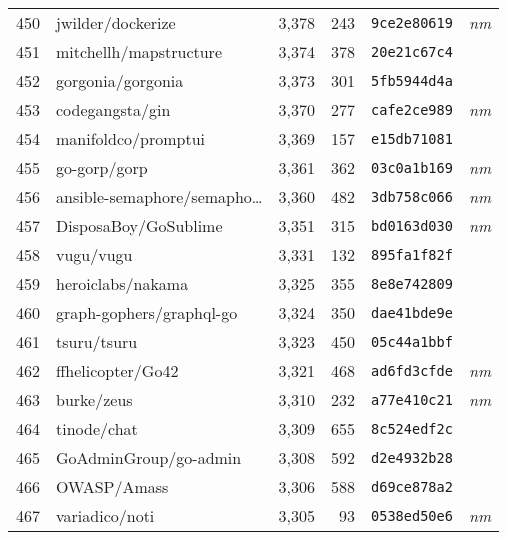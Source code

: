 {\begin{supertabular}{llrrll}
        450 &                  jwilder/dockerize &  3,378 &    243 &  \texttt{9ce2e80619} &  \textit{nm} \\
        451 &             mitchellh/mapstructure &  3,374 &    378 &  \texttt{20e21c67c4} &              \\
        452 &                  gorgonia/gorgonia &  3,373 &    301 &  \texttt{5fb5944d4a} &              \\
        453 &                    codegangsta/gin &  3,370 &    277 &  \texttt{cafe2ce989} &  \textit{nm} \\
        454 &                manifoldco/promptui &  3,369 &    157 &  \texttt{e15db71081} &              \\
        455 &                       go-gorp/gorp &  3,361 &    362 &  \texttt{03c0a1b169} &  \textit{nm} \\
        456 &    ansible-semaphore/semapho\ldots &  3,360 &    482 &  \texttt{3db758c066} &  \textit{nm} \\
        457 &               DisposaBoy/GoSublime &  3,351 &    315 &  \texttt{bd0163d030} &  \textit{nm} \\
        458 &                          vugu/vugu &  3,331 &    132 &  \texttt{895fa1f82f} &              \\
        459 &                  heroiclabs/nakama &  3,325 &    355 &  \texttt{8e8e742809} &              \\
        460 &           graph-gophers/graphql-go &  3,324 &    350 &  \texttt{dae41bde9e} &              \\
        461 &                        tsuru/tsuru &  3,323 &    450 &  \texttt{05c44a1bbf} &              \\
        462 &                  ffhelicopter/Go42 &  3,321 &    468 &  \texttt{ad6fd3cfde} &  \textit{nm} \\
        463 &                         burke/zeus &  3,310 &    232 &  \texttt{a77e410c21} &  \textit{nm} \\
        464 &                        tinode/chat &  3,309 &    655 &  \texttt{8c524edf2c} &              \\
        465 &              GoAdminGroup/go-admin &  3,308 &    592 &  \texttt{d2e4932b28} &              \\
        466 &                        OWASP/Amass &  3,306 &    588 &  \texttt{d69ce878a2} &              \\
        467 &                     variadico/noti &  3,305 &     93 &  \texttt{0538ed50e6} &  \textit{nm} \\

\end{supertabular}}
